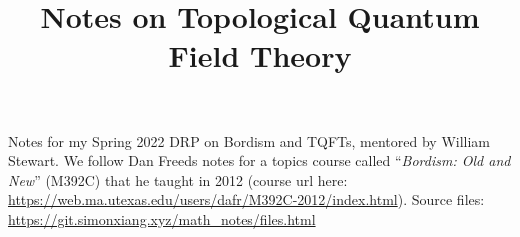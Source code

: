 \documentclass[fontsize=9pt]{article}
\title{Notes on Topological Quantum Field Theory}
\begin{document}
\maketitle
Notes for my Spring 2022 DRP on Bordism and TQFTs, mentored by William Stewart. We follow Dan Freeds notes for a topics course called ``\emph{Bordism: Old and New}'' (M392C) that he taught in 2012 (course url here: \url{https://web.ma.utexas.edu/users/dafr/M392C-2012/index.html}). Source files: \url{https://git.simonxiang.xyz/math_notes/files.html}

\tableofcontents
\newpage
    
    
    
    
\end{document}
